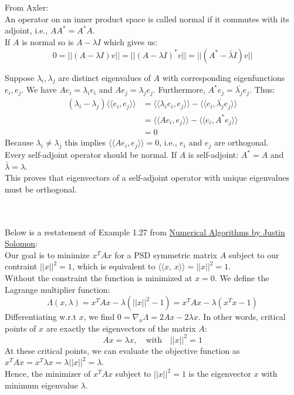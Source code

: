 \documentclass{article}
\def\grad{\nabla}
\def\ll{\langle\langle}
\def\rr{\rangle\rangle}
\begin{document}
\pagebreak
{}\\\\


From Axler:\\

An operator on an inner product space is called normal if it commutes with its adjoint, i.e., $AA^* = A^*A$.\\
If $A$ is normal so is $A - \lambda I$ which gives us:
$$
    0 = ||(A - \lambda I)v|| = ||(A - \lambda I)^* v|| = ||(A^* - \bar{\lambda} I)v||
$$

Suppose $\lambda_i, \lambda_j$ are distinct eigenvalues of $A$ with corresponding eigenfunctions $e_i, e_j$.
We have $Ae_i = \lambda_i e_i$ and $Ae_j = \lambda_j e_j$. Furthermore, $A^*e_j = \bar{\lambda_j}e_j$. Thus:
\begin{align*}
    (\lambda_i -  \lambda_j) \ll e_i, e_j \rr &= \ll \lambda_i e_i, e_j \rr  - \ll e_i, \bar{\lambda_j}e_j \rr \\
        &= \ll A e_i, e_j \rr - \ll e_i, A^* e_j \rr \\
        &= 0
\end{align*}
Because $\lambda_i \neq \lambda_j$ this implies $\ll A e_i, e_j \rr = 0$, i.e., $e_i$ and $e_j$ are orthogonal.\\
Every self-adjoint operator should be normal. If $A$ is self-adjoint: $A^* = A$ and $\bar{\lambda} = \lambda$. \\
This proves that eigenvectors of a self-adjoint operator with unique eigenvalues must be orthogonal.


\vspace{1.8cm}
\\\\


Below is a restatement of Example 1.27 from \href{https://people.csail.mit.edu/jsolomon/}{Numerical Algorithms by Justin Solomon}:\\

Our goal is to minimize $x^TAx$ for a PSD symmetric matrix $A$ subject to our contraint $||x||^2 = 1$,
which is equivalent to $\ll x,\,x \rr = ||x||^2 = 1$.\\

Without the constraint the function is minimized at $x = 0$. We define the Lagrange multiplier function:
$$
    \Lambda(x, \lambda) = x^TAx - \lambda(||x||^2 - 1) = x^TAx - \lambda(x^Tx - 1)
$$
Differentiating w.r.t $x$, we find $0 = \grad_x \Lambda = 2Ax - 2\lambda x$. In other words, critical points of $x$ are exactly
the eigenvectors of the matrix $A$:
$$
    Ax = \lambda x, \quad \text{with} \quad ||x||^2 = 1
$$
At these critical points, we can evaluate the objective function as $x^TAx = x^T\lambda x = \lambda||x||^2 = \lambda$.\\
Hence, the minimizer of $x^TAx$ subject to $||x||^2 = 1$ is the eigenvector $x$ with minimum eigenvalue $\lambda$.
\end{document}
